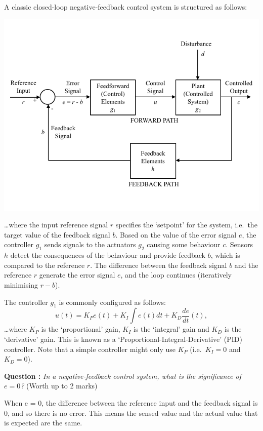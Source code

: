 \documentclass[hidelinks,a4paper,11pt]{article}
\newcounter{question}
\newcommand\myq{\refstepcounter{question}\thequestion}
\begin{document}
	A classic closed-loop negative-feedback control system is structured as follows:
	\begin{center}
		\includegraphics[width=\textwidth]{ClassicControlSystem.png}
	\end{center}
	
	\ldots where the input reference signal $r$ specifies the `setpoint' for the system, i.e.\ the target value of the feedback signal $b$.  Based on the value of the error signal $e$, the controller $g_1$ sends signals to the actuators $g_2$ causing some behaviour $c$.  Sensors $h$ detect the consequences of the behaviour and provide feedback $b$, which is compared to the reference $r$.  The difference between the feedback signal $b$ and the reference $r$ generate the error signal $e$, and the loop continues (iteratively minimising $r-b$).
	
	The controller $g_1$ is commonly configured as follows:
	$$u(t) = K_P e(t) + K_I \int e(t)dt + K_D \frac{de}{dt}(t) ,$$
	\ldots where $K{_P}$ is the `proportional' gain, $K_I$ is the `integral' gain and $K_D$ is the `derivative' gain.  This is known as a `Proportional-Integral-Derivative' (PID) controller.  Note that a simple controller might only use $K_P$ (i.e.\ $K_I=0$ and $K_D=0$).
	
	{\bfseries Question \myq:}  \emph{In a negative-feedback control system, what is the significance of $e=0$?} (Worth up to 2 marks)\\
	\begin{mdframed}
		When e = 0, the difference between the reference input and the feedback signal is 0, and so there is no error. This means the sensed value and the actual value that is expected are the same.
	\end{mdframed}
	\vspace*{\baselineskip}
	
\end{document}
